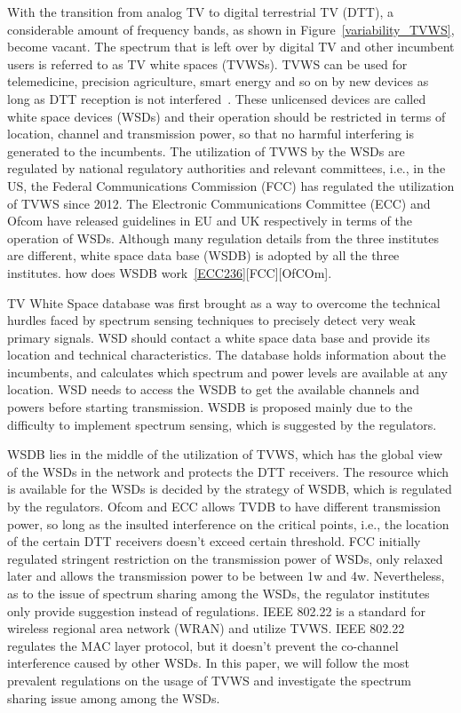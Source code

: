 \documentclass[times]{ettauth}
\newcommand{\ie}{i.e., }
\theoremstyle{mytheoremstyle}
\theoremstyle{mytheoremstyle}
\theoremstyle{mytheoremstyle}
\begin{document}
With the transition from analog TV to digital terrestrial TV (DTT), a considerable amount of frequency bands, as shown in Figure~\ref{variability_TVWS}, become vacant.
The spectrum that is left over by digital TV and other incumbent users is referred to as TV white spaces (TVWSs).
TVWS can be used for telemedicine, precision agriculture, smart energy and so on by new devices as long as DTT reception is not interfered~\cite{FCC_2010_sedond_memorandumm}. 
These unlicensed devices are called white space devices (WSDs) and their operation should be restricted in terms of location, channel and transmission power, so that no harmful interfering is generated to the incumbents.
The utilization of TVWS by the WSDs are regulated by national regulatory authorities and relevant committees, \ie in the US, the Federal Communications Commission (FCC) has regulated the utilization of TVWS since 2012. 
The Electronic Communications Committee (ECC) and Ofcom have released guidelines in EU and UK respectively in terms of the operation of WSDs.
Although many regulation details from the three institutes are different, white space data base (WSDB) is adopted by all the three institutes.
how does WSDB work~\ref{ECC236}[FCC][OfCOm].

TV White Space database was first brought as a way to overcome the technical hurdles faced by spectrum sensing techniques to precisely detect very weak primary signals.
WSD should contact a white space data base and provide its location and technical characteristics.
The database holds information about the incumbents, and calculates which spectrum and power levels are available at any location.
WSD needs to access the WSDB to get the available channels and powers before starting transmission.
WSDB is proposed mainly due to the difficulty to implement spectrum sensing, which is suggested by the regulators.

WSDB lies in the middle of the utilization of TVWS, which has the global view of the WSDs in the network and protects the DTT receivers.
The resource which is available for the WSDs is decided by the strategy of WSDB, which is regulated by the regulators.
Ofcom and ECC allows TVDB to have different transmission power, so long as the insulted interference on the critical points, i.e., the location of the certain DTT receivers doesn’t exceed certain threshold.
FCC initially regulated stringent restriction on the transmission power of WSDs, only relaxed later and allows the transmission power to be between 1w and 4w.
%
Nevertheless, as to the issue of spectrum sharing among the WSDs, the regulator institutes only provide suggestion instead of regulations.
IEEE 802.22 is a standard for wireless regional area network (WRAN) and utilize TVWS.
IEEE 802.22 regulates the MAC layer protocol, but it doesn't prevent the co-channel interference caused by other WSDs.
In this paper, we will follow the most prevalent regulations on the usage of TVWS and investigate the spectrum sharing issue among among the WSDs.
\end{document}
